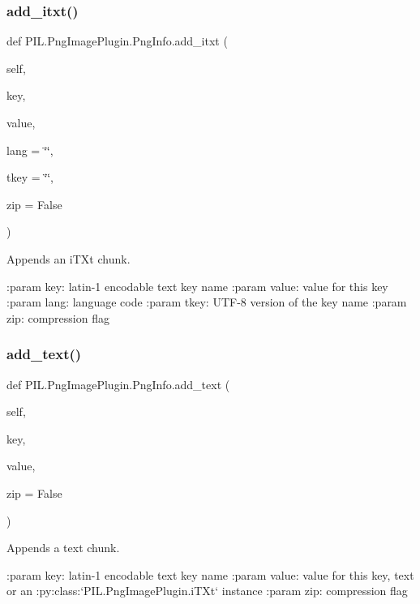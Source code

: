 \subsubsection{\texorpdfstring{add\+\_\+itxt()}{add\_itxt()}}
{\footnotesize\ttfamily def P\+I\+L.\+Png\+Image\+Plugin.\+Png\+Info.\+add\+\_\+itxt (\begin{DoxyParamCaption}\item[{}]{self,  }\item[{}]{key,  }\item[{}]{value,  }\item[{}]{lang = {\ttfamily \char`\"{}\char`\"{}},  }\item[{}]{tkey = {\ttfamily \char`\"{}\char`\"{}},  }\item[{}]{zip = {\ttfamily False} }\end{DoxyParamCaption})}

\begin{DoxyVerb}Appends an iTXt chunk.

:param key: latin-1 encodable text key name
:param value: value for this key
:param lang: language code
:param tkey: UTF-8 version of the key name
:param zip: compression flag\end{DoxyVerb}
 \mbox{\label{classPIL_1_1PngImagePlugin_1_1PngInfo_ad123e11037f40a30c57da5a412cfa837}} 
\subsubsection{\texorpdfstring{add\+\_\+text()}{add\_text()}}
{\footnotesize\ttfamily def P\+I\+L.\+Png\+Image\+Plugin.\+Png\+Info.\+add\+\_\+text (\begin{DoxyParamCaption}\item[{}]{self,  }\item[{}]{key,  }\item[{}]{value,  }\item[{}]{zip = {\ttfamily False} }\end{DoxyParamCaption})}

\begin{DoxyVerb}Appends a text chunk.

:param key: latin-1 encodable text key name
:param value: value for this key, text or an
   :py:class:`PIL.PngImagePlugin.iTXt` instance
:param zip: compression flag\end{DoxyVerb}
 

